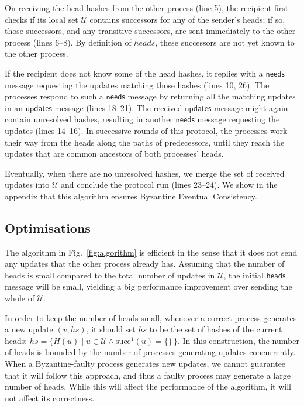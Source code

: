 \documentclass[manuscript,anonymous]{acmart}
\begin{document}
On receiving the head hashes from the other process (line 5), the recipient first checks if its local set $\mathcal{U}$ contains successors for any of the sender's heads; if so, those successors, and any transitive successors, are sent immediately to the other process (lines 6--8).
By definition of $\mathit{heads}$, these successors are not yet known to the other process.

If the recipient does not know some of the head hashes, it replies with a $\mathsf{needs}$ message requesting the updates matching those hashes (lines 10, 26).
The processes respond to such a $\mathsf{needs}$ message by returning all the matching updates in an $\mathsf{updates}$ message (lines 18--21).
The received $\mathsf{updates}$ message might again contain unresolved hashes, resulting in another $\mathsf{needs}$ message requesting the updates (lines 14--16).
In successive rounds of this protocol, the processes work their way from the heads along the paths of predecessors, until they reach the updates that are common ancestors of both processes' heads.

Eventually, when there are no unresolved hashes, we merge the set of received updates into $\mathcal{U}$ and conclude the protocol run (lines 23--24).
We show in the appendix that this algorithm ensures Byzantine Eventual Consistency.

\subsection{Optimisations}\label{sec:optimisations}

The algorithm in Fig.~\ref{fig:algorithm} is efficient in the sense that it does not send any updates that the other process already has.
Assuming that the number of heads is small compared to the total number of updates in $\mathcal{U}$, the initial $\mathsf{heads}$ message will be small, yielding a big performance improvement over sending the whole of $\mathcal{U}$.

In order to keep the number of heads small, whenever a correct process generates a new update $(v, \mathit{hs})$, it should set $\mathit{hs}$ to be the set of hashes of the current heads:
$\mathit{hs} = \{H(u) \mid u \in \mathcal{U} \wedge \mathrm{succ}^1(u) = \{\}\,\}$.
In this construction, the number of heads is bounded by the number of processes generating updates concurrently.
When a Byzantine-faulty process generates new updates, we cannot guarantee that it will follow this approach, and thus a faulty process may generate a large number of heads.
While this will affect the performance of the algorithm, it will not affect its correctness.
\end{document}
